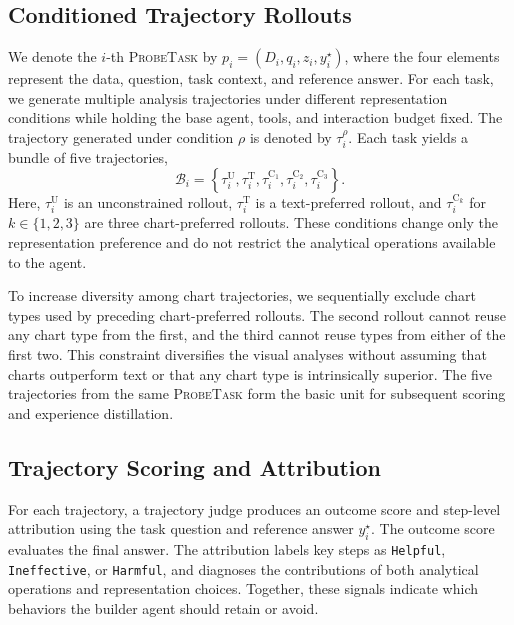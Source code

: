 \documentclass{article}
\newcommand{\probe}{\textsc{ProbeTask}}
\begin{document}
\subsection{Conditioned Trajectory Rollouts}
\label{sec:conditioned-rollouts}

We denote the $i$-th \probe{} by $p_i=(D_i,q_i,z_i,y_i^{\star})$, where the four elements represent the data, question, task context, and reference answer.
For each task, we generate multiple analysis trajectories under different representation conditions while holding the base agent, tools, and interaction budget fixed.
The trajectory generated under condition $\rho$ is denoted by $\tau_i^{\rho}$.
Each task yields a bundle of five trajectories,
\begin{equation}
\mathcal{B}_i=
\left\{
\tau_i^{\mathrm{U}},
\tau_i^{\mathrm{T}},
\tau_i^{\mathrm{C}_1},
\tau_i^{\mathrm{C}_2},
\tau_i^{\mathrm{C}_3}
\right\}.
\end{equation}
Here, $\tau_i^{\mathrm{U}}$ is an unconstrained rollout, $\tau_i^{\mathrm{T}}$ is a text-preferred rollout, and $\tau_i^{\mathrm{C}_k}$ for $k\in\{1,2,3\}$ are three chart-preferred rollouts.
These conditions change only the representation preference and do not restrict the analytical operations available to the agent.

To increase diversity among chart trajectories, we sequentially exclude chart types used by preceding chart-preferred rollouts.
The second rollout cannot reuse any chart type from the first, and the third cannot reuse types from either of the first two.
This constraint diversifies the visual analyses without assuming that charts outperform text or that any chart type is intrinsically superior.
The five trajectories from the same \probe{} form the basic unit for subsequent scoring and experience distillation.

\subsection{Trajectory Scoring and Attribution}
\label{sec:trajectory-attribution}

For each trajectory, a trajectory judge produces an outcome score and step-level attribution using the task question and reference answer $y_i^{\star}$.
The outcome score evaluates the final answer.
The attribution labels key steps as \texttt{Helpful}, \texttt{Ineffective}, or \texttt{Harmful}, and diagnoses the contributions of both analytical operations and representation choices.
Together, these signals indicate which behaviors the builder agent should retain or avoid.
\end{document}
